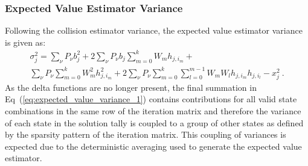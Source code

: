 \subsubsection{Expected Value Estimator Variance}
\label{subsubsec:expected_value_estimator_variance}
Following the collision estimator variance, the expected value
estimator variance is given as:
\begin{multline}
  \sigma_j^2 = \sum_{\nu} P_{\nu} b_j^2 + 2 \sum_{\nu} P_{\nu} b_j
  \sum_{m=0}^k W_{m} h_{j,i_m} +\\ \sum_{\nu} P_{\nu} \sum_{m=0}^k
  W_{m}^2 h_{j,i_m}^2 + 2 \sum_{\nu} P_{\nu} \sum_{m=0}^k
  \sum_{l=0}^{m-1} W_m W_l h_{j,i_m} h_{j,i_l} - x_j^2\:.
  \label{eq:expected_value_variance_1}
\end{multline}
As the delta functions are no longer present, the final summation in
Eq~(\ref{eq:expected_value_variance_1}) contains contributions for all
valid state combinations in the same row of the iteration matrix and
therefore the variance of each state in the solution tally is coupled
to a group of other states as defined by the sparsity pattern of the
iteration matrix. This coupling of variances is expected due to the
deterministic averaging used to generate the expected value estimator.

